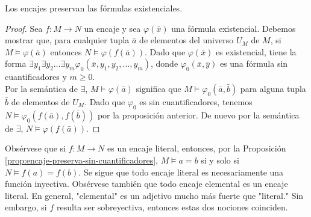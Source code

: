 \message{ !name(main.tex)}\documentclass[12pt,a4paper]{book}
\newcommand{\comillas}[1]{"#1"}
\begin{document}
    \begin{proposicion}\label{prop:encaje-preserva-existenciales}
        Los encajes preservan las fórmulas existenciales.
    \end{proposicion}
    \begin{proof}
        Sea $f:M\rightarrow N$ un encaje y sea $\varphi(\bar{x})$ una fórmula existencial. Debemos mostrar que, para
        cualquier tupla $\bar{a}$ de elementos del universo $U_{M}$ de $M$, si $M\models\varphi(\bar{a})$ entonces
        $N\models\varphi(f(\bar{a}))$. Dado que $\varphi(\bar{x})$ es existencial, tiene la forma
        $\exists y_{1}\exists y_{2}\dots\exists y_{m}\varphi_{0}(\bar{x},y_{1},y_{2},\dots,y_{m})$, donde
        $\varphi_{0}(\bar{x},\bar{y})$ es una fórmula sin cuantificadores y $m\geq 0$.\\
        Por la semántica de $\exists$, $M\models\varphi(\bar{a})$ significa que $M\models\varphi_{0}(\bar{a},\bar{b})$ para
        alguna tupla $\bar{b}$ de elementos de $U_{M}$. Dado que $\varphi_{0}$ es sin cuantificadores, tenemos
        $N\models\varphi_{0}(f(\bar{a}),f(\bar{b}))$ por la proposición anterior. De nuevo por la semántica de $\exists$,
        $N\models\varphi(f(\bar{a}))$.
    \end{proof}

    Obsérvese que si $f:M\rightarrow N$ es un encaje literal, entonces, por la Proposición
    \ref{prop:encaje-preserva-sin-cuantificadores}, $M\models a=b$ si y solo si $N\models f(a)=f(b)$. Se sigue que todo
    encaje literal es necesariamente una función inyectiva. Obsérvese también que todo encaje elemental es un encaje
    literal. En general, \comillas{elemental} es un adjetivo mucho más fuerte que \comillas{literal.} Sin embargo, si $f$
    resulta ser sobreyectiva, entonces estas dos nociones coinciden.
\end{document}
